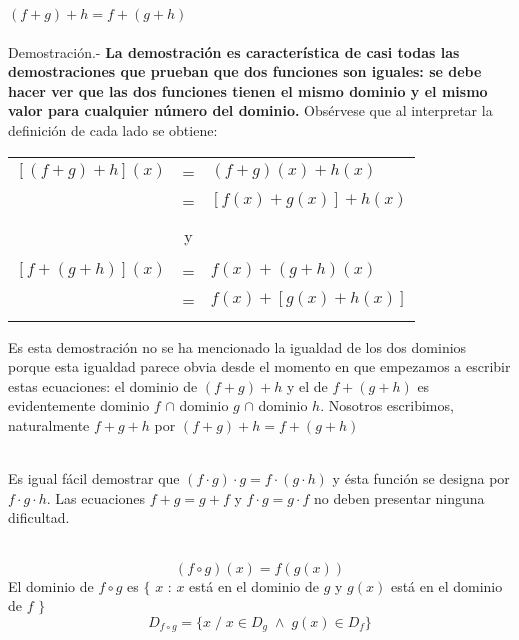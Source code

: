 \begin{teo}
    $(f+g)+h=f+(g+h)$\\\\
    Demostración.- \; \textbf{La demostración es característica de casi todas las demostraciones que prueban que dos funciones son iguales: se debe hacer ver que las dos funciones tienen el mismo dominio y el mismo valor para cualquier número del dominio.} Obsérvese que al interpretar la definición de cada lado se obtiene:
    \begin{center}
	\begin{tabular}{r c l}
	    $\left[ (f+g) + h \right](x)$&=&$(f+g)(x)+h(x)$\\
	    &=&$\left[ f(x) +g(x) \right] +h(x)$\\\\
	    &y&\\\\
	    $\left[ f+(g+h) \right](x)$&=&$f(x)+(g+h)(x)$\\
	    &=&$f(x)+\left[ g(x)+h(x) \right]$\\\\
	\end{tabular}
    \end{center}
    Es esta demostración no se ha mencionado la igualdad de los dos dominios porque esta igualdad parece obvia desde el momento en que empezamos a escribir estas ecuaciones: el dominio de $(f+g)+h$ y el de $f+(g+h)$ es evidentemente dominio $f$ $\cap$ dominio $g$ $\cap$ dominio $h$. Nosotros escribimos, naturalmente $f+g+h$ por $(f+g)+h=f+(g+h)$\\\\
\end{teo}

\begin{teo}
    Es igual fácil demostrar que $(f\cdot g)\cdot g=f\cdot (g \cdot h)$ y ésta función se designa por $f \cdot g \cdot h$. Las ecuaciones $f+g=g+f$ \; y \; $f\cdot g=g \cdot f$ no deben presentar ninguna dificultad.\\\\
\end{teo}

\begin{tcolorbox}[colframe=white]
    \begin{def.}
	$$(f \circ g)(x)=f(g(x))$$
	El dominio de $f\circ g$ es $\lbrace $ $x$ : $x$ está en el dominio de $g$ \: y \; $g(x)$ está en el dominio de $f$ $\rbrace$
	$$D_{f \circ g}= \lbrace x \; / \; x \in D_g \; \land \; g(x)\in D_f \rbrace$$
    \end{def.}
\end{tcolorbox}

